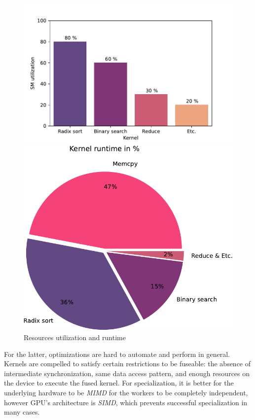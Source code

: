 \begin{figure}
\begin{minipage}{0.45\textwidth}
    \centering
    \includegraphics[width=\linewidth]{figures/fig_2_bar.pdf}
\end{minipage}
\hfill
\begin{minipage}{0.45\textwidth}
    \centering
    \includegraphics[width=0.8\linewidth]{figures/pdfresizer.com-pdf-crop.pdf}
\end{minipage}
\caption{Resources utilization and runtime}
    \label{fig:SMperf}
\end{figure}

For the latter, optimizations are hard to automate and perform in general.
Kernels are compelled to satisfy certain restrictions to be fuseable: the absence of intermediate synchronization, same data access pattern, and enough resources on the device to execute the fused kernel. 
For specialization, it is better for the underlying hardware to be \emph{MIMD} for the workers to be completely independent, however GPU's architecture is \emph{SIMD}, which prevents successful specialization in many cases.

